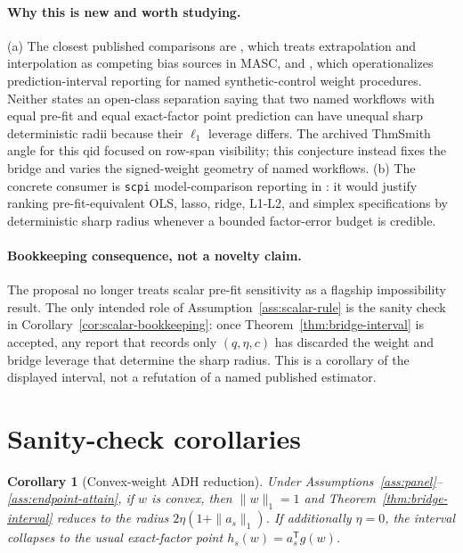 \documentclass[11pt]{article}
\newcommand{\transpose}{\mathsf{T}}
\theoremstyle{definition}
\theoremstyle{plain}
\newtheorem{corollary}{Corollary}
\theoremstyle{remark}
\begin{document}
\paragraph{Why this is new and worth studying.}
(a) The closest published comparisons are \citet{KelloggMogstadPouliotTorgovitsky2021}, which treats extrapolation and interpolation as competing bias sources in MASC, and \citet{CattaneoFengPalombaTitiunik2025JSS}, which operationalizes prediction-interval reporting for named synthetic-control weight procedures. Neither states an open-class separation saying that two named workflows with equal pre-fit and equal exact-factor point prediction can have unequal sharp deterministic radii because their \(\ell_1\) leverage differs. The archived ThmSmith angle for this qid focused on row-span visibility; this conjecture instead fixes the bridge and varies the signed-weight geometry of named workflows. (b) The concrete consumer is \texttt{scpi} model-comparison reporting in \citet{CattaneoFengPalombaTitiunik2025JSS}: it would justify ranking pre-fit-equivalent OLS, lasso, ridge, L1-L2, and simplex specifications by deterministic sharp radius whenever a bounded factor-error budget is credible.

\paragraph{Bookkeeping consequence, not a novelty claim.}
The proposal no longer treats scalar pre-fit sensitivity as a flagship impossibility result. The only intended role of Assumption~\ref{ass:scalar-rule} is the sanity check in Corollary~\ref{cor:scalar-bookkeeping}: once Theorem~\ref{thm:bridge-interval} is accepted, any report that records only \((q,\eta,c)\) has discarded the weight and bridge leverage that determine the sharp radius. This is a corollary of the displayed interval, not a refutation of a named published estimator.

\section{Sanity-check corollaries}
\begin{corollary}[Convex-weight ADH reduction]\label{cor:convex}
Under Assumptions~\ref{ass:panel}--\ref{ass:endpoint-attain}, if \(w\) is convex, then \(\|w\|_1=1\) and Theorem~\ref{thm:bridge-interval} reduces to the radius \(2\eta(1+\|a_s\|_1)\). If additionally \(\eta=0\), the interval collapses to the usual exact-factor point \(h_s(w)=a_s^\transpose g(w)\).
\end{corollary}
\end{document}
